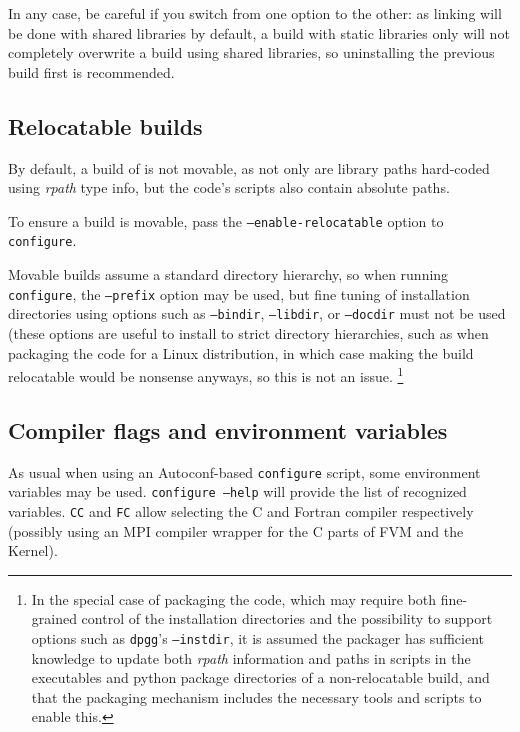 \documentclass[a4paper,10pt,twoside]{csshortdoc}
\begin{document}
In any case, be careful if you switch from one option to the other: as
linking will be done with shared libraries by default, a build
with static libraries only will not completely overwrite a build using
shared libraries, so uninstalling the previous build first
is recommended.

\subsection{Relocatable builds\label{sec:config:relocatable}}

By default, a build of \CS is not movable, as not only
are library paths hard-coded using \emph{rpath} type info,
but the code's scripts also contain absolute paths.

To ensure a build is movable, pass the \texttt{--enable-relocatable} option
to {\tt configure}.

Movable builds assume a standard directory hierarchy, so when running
{\tt configure}, the \texttt{--prefix} option may be used, but fine tuning
of installation directories using options such as \texttt{--bindir},
\texttt{--libdir}, or \texttt{--docdir} must not be used
(these options are useful to install to strict directory hierarchies,
such as when packaging the code for a Linux distribution,
in which case making the build relocatable would be nonsense anyways,
so this is not an issue.
\footnote{In the special case of packaging the code, which
may require both fine-grained control of the installation directories
and the possibility to support options such as \texttt{dpgg}'s
\texttt{--instdir}, it is assumed the packager has sufficient knowledge to
update both \emph{rpath} information and paths in scripts in the executables
and python package directories of a non-relocatable build, and that the
packaging mechanism includes the necessary tools and scripts to enable this.}

\subsection{Compiler flags and environment variables\label{sec:config:flags}}

As usual when using an Autoconf-based \texttt{configure} script,
some environment variables may be used. \texttt{configure --help}
will provide the list of recognized variables.
\texttt{CC} and \texttt{FC} allow selecting the C and Fortran compiler
respectively (possibly using an MPI compiler wrapper for the C parts
of FVM and the Kernel).
\end{document}
